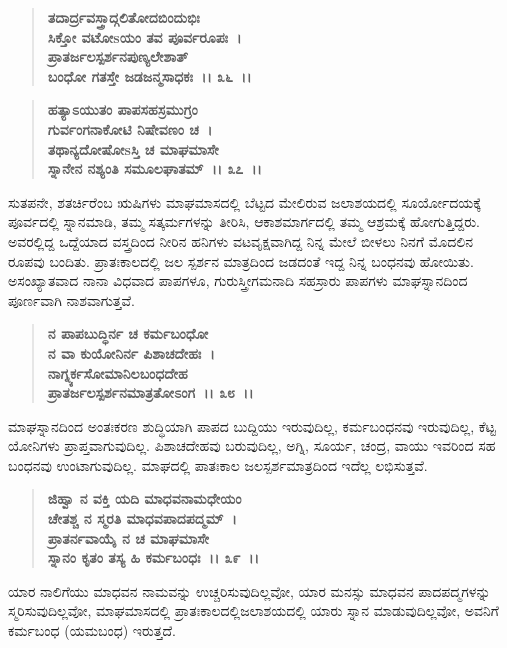 \begin{verse}
\textbf{ತದಾರ್ದ್ರವಸ್ತ್ರಾದ್ಗಲಿತೋದಬಿಂದುಭಿಃ}\\\textbf{ಸಿಕ್ತೋ ವಟೋsಯಂ ತವ ಪೂರ್ವರೂಪಃ~। }\\\textbf{ಪ್ರಾತರ್ಜಲಸ್ಪರ್ಶನಪುಣ್ಯಲೇಶಾತ್} \\\textbf{ಬಂಧೋ ಗತಸ್ತೇ ಜಡಜನ್ಮಸಾಧಕಃ~।। ೩೬~।।}
\end{verse}

\begin{verse}
\textbf{ಹತ್ಯಾಽಯುತಂ ಪಾಪಸಹಸ್ರಮುಗ್ರಂ}\\\textbf{ಗುರ್ವಂಗನಾಕೋಟಿ ನಿಷೇವಣಂ ಚ~।}\\\textbf{ತಥಾನ್ಯದೋಷೋsಸ್ತಿ ಚ ಮಾಘಮಾಸೇ} \\\textbf{ಸ್ನಾನೇನ ನಶ್ಯಂತಿ ಸಮೂಲಘಾತಮ್~।। ೩೭~।।}
\end{verse}

ಸುತಪನೇ, ಶತರ್ಚಿರೆಂಬ ಋಷಿಗಳು ಮಾಘಮಾಸದಲ್ಲಿ ಬೆಟ್ಟದ ಮೇಲಿರುವ ಜಲಾಶಯದಲ್ಲಿ ಸೂರ್ಯೋದಯಕ್ಕೆ ಪೂರ್ವದಲ್ಲಿ ಸ್ನಾನಮಾಡಿ, ತಮ್ಮ ಸತ್ಕರ್ಮಗಳನ್ನು ತೀರಿಸಿ, ಆಕಾಶಮಾರ್ಗದಲ್ಲಿ ತಮ್ಮ ಆಶ್ರಮಕ್ಕೆ ಹೋಗುತ್ತಿದ್ದರು. ಅವರಲ್ಲಿದ್ದ ಒದ್ದೆಯಾದ ವಸ್ತ್ರದಿಂದ ನೀರಿನ ಹನಿಗಳು ವಟವೃಕ್ಷವಾಗಿದ್ದ ನಿನ್ನ ಮೇಲೆ ಬೀಳಲು ನಿನಗೆ ಮೊದಲಿನ ರೂಪವು ಬಂದಿತು. ಪ್ರಾತಃಕಾಲದಲ್ಲಿ ಜಲ ಸ್ಪರ್ಶನ ಮಾತ್ರದಿಂದ ಜಡದಂತೆ ಇದ್ದ ನಿನ್ನ ಬಂಧನವು ಹೋಯಿತು. ಅಸಂಖ್ಯಾತವಾದ ನಾನಾ ವಿಧವಾದ ಪಾಪಗಳೂ, ಗುರುಸ್ತ್ರೀಗಮನಾದಿ ಸಹಸ್ರಾರು ಪಾಪಗಳು ಮಾಘಸ್ನಾನದಿಂದ ಪೂರ್ಣವಾಗಿ ನಾಶವಾಗುತ್ತವೆ.

\begin{verse}
\textbf{ನ ಪಾಪಬುದ್ಧಿರ್ನ ಚ ಕರ್ಮಬಂಧೋ}\\\textbf{ನ ವಾ ಕುಯೋನಿರ್ನ ಪಿಶಾಚದೇಹಃ~। }\\\textbf{ನಾಗ್ನ್ಯರ್ಕಸೋಮಾನಿಲಬಂಧದೇಹ} \\\textbf{ಪ್ರಾತರ್ಜಲಸ್ಪರ್ಶನಮಾತ್ರತೋಽಂಗ~।। ೩೮~।।}
\end{verse}

ಮಾಘಸ್ನಾನದಿಂದ ಅಂತಃಕರಣ ಶುದ್ಧಿಯಾಗಿ ಪಾಪದ ಬುದ್ದಿಯು ಇರುವುದಿಲ್ಲ, ಕರ್ಮಬಂಧನವು ಇರುವುದಿಲ್ಲ, ಕೆಟ್ಟ ಯೋನಿಗಳು ಪ್ರಾಪ್ತವಾಗುವುದಿಲ್ಲ. ಪಿಶಾಚದೇಹವು ಬರುವುದಿಲ್ಲ, ಅಗ್ನಿ, ಸೂರ್ಯ, ಚಂದ್ರ, ವಾಯು ಇವರಿಂದ ಸಹ ಬಂಧನವು ಉಂಟಾಗುವುದಿಲ್ಲ. ಮಾಘದಲ್ಲಿ ಪಾತಃಕಾಲ ಜಲಸ್ಪರ್ಶಮಾತ್ರದಿಂದ ಇದೆಲ್ಲ ಲಭಿಸುತ್ತವೆ.

\begin{verse}
\textbf{ಜಿಹ್ವಾ ನ ವಕ್ತಿ ಯದಿ ಮಾಧವನಾಮಧೇಯಂ}\\\textbf{ಚೇತಶ್ಚ ನ ಸ್ಮರತಿ ಮಾಧವಪಾದಪದ್ಮಮ್~। }\\\textbf{ಪ್ರಾತರ್ನವಾಯೈ ನ ಚ ಮಾಘಮಾಸೇ} \\\textbf{ಸ್ನಾನಂ ಕೃತಂ ತಸ್ಯ ಹಿ ಕರ್ಮಬಂಧಃ~।। ೩೯~।।}
\end{verse}

ಯಾರ ನಾಲಿಗೆಯು ಮಾಧವನ ನಾಮವನ್ನು ಉಚ್ಚರಿಸುವುದಿಲ್ಲವೋ, ಯಾರ ಮನಸ್ಸು ಮಾಧವನ ಪಾದಪದ್ಮಗಳನ್ನು ಸ್ಮರಿಸುವುದಿಲ್ಲವೋ, ಮಾಘಮಾಸದಲ್ಲಿ ಪ್ರಾತಃಕಾಲದಲ್ಲಿ\break ಜಲಾಶಯದಲ್ಲಿ ಯಾರು ಸ್ನಾನ ಮಾಡುವುದಿಲ್ಲವೋ, ಅವನಿಗೆ ಕರ್ಮಬಂಧ (ಯಮಬಂಧ) ಇರುತ್ತದೆ.

